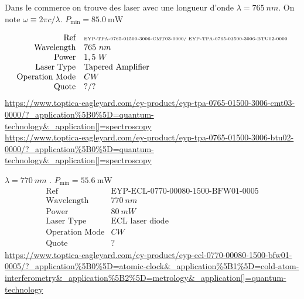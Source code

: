 {\begin{itemize}
{\color{gray} \tiny  
	\item Dans le commerce on trouve des laser avec une longueur d'onde $\lambda = 765~nm$. On note $\omega \equiv 2 \pi c / \lambda $. $P_{\text{min}} = 85.0~\text{mW}$ 

$$
\begin{array}{rl}
	\mbox{Ref} & \mbox{\tiny EYP-TPA-0765-01500-3006-CMT03-0000/ EYP-TPA-0765-01500-3006-BTU02-0000}\\
	\mbox{Wavelength} & 	765 ~nm\\
	\mbox{Power} & 1,5~ W\\
	\mbox{Laser Type} & \mbox{Tapered Amplifier}\\
	\mbox{Operation Mode} & CW\\
	\mbox{Quote} & ? / ?
\end{array}
$$
\url{https://www.toptica-eagleyard.com/ey-product/eyp-tpa-0765-01500-3006-cmt03-0000/?_application%5B0%5D=quantum-technology&_application[]=spectroscopy}\\
\url{https://www.toptica-eagleyard.com/ey-product/eyp-tpa-0765-01500-3006-btu02-0000/?_application%5B0%5D=quantum-technology&_application[]=spectroscopy}

	\item $\lambda = 770~nm$ . $P_{\text{min}} = 55.6~\text{mW}$
$$
\begin{array}{rl}
	\mbox{Ref} & \mbox{EYP-ECL-0770-00080-1500-BFW01-0005}\\
	\mbox{Wavelength} & 	770 ~nm\\
	\mbox{Power} & 80 ~ mW\\
	\mbox{Laser Type} & \mbox{ECL laser diode}\\
	\mbox{Operation Mode} & CW\\
	\mbox{Quote} & ?
\end{array}
$$ 
\url{https://www.toptica-eagleyard.com/ey-product/eyp-ecl-0770-00080-1500-bfw01-0005/?_application%5B0%5D=atomic-clock&_application%5B1%5D=cold-atom-interferometry&_application%5B2%5D=metrology&_application[]=quantum-technology}	

}
\end{itemize}

}
